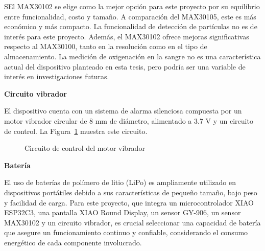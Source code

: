 \documentclass[
  letterpaper,
  DIV=11,
  numbers=noendperiod]{scrreport}
\begin{document}
SEl MAX30102 se elige como la mejor opción para este proyecto por su
equilibrio entre funcionalidad, costo y tamaño. A comparación del
MAX30105, este es más económico y más compacto. La funcionalidad de
detección de partículas no es de interés para este proyecto. Además, el
MAX30102 ofrece mejoras significativas respecto al MAX30100, tanto en la
resolución como en el tipo de almacenamiento. La medición de oxigenación
en la sangre no es una característica actual del dispositivo planteado
en esta tesis, pero podría ser una variable de interés en
investigaciones futuras.

\textbf{Circuito vibrador}

El dispositivo cuenta con un sistema de alarma silenciosa compuesta por
un motor vibrador circular de 8 mm de diámetro, alimentado a 3.7 V y un
circuito de control. La Figura~\ref{fig-circuito_motor} muestra este
circuito.

\begin{figure}


\caption{\label{fig-circuito_motor}Circuito de control del motor
vibrador}

\end{figure}%

\textbf{Batería}

El uso de baterías de polímero de litio (LiPo) es ampliamente utilizado
en dispositivos portátiles debido a sus características de pequeño
tamaño, bajo peso y facilidad de carga. Para este proyecto, que integra
un microcontrolador XIAO ESP32C3, una pantalla XIAO Round Display, un
sensor GY-906, un sensor MAX30102 y un circuito vibrador, es crucial
seleccionar una capacidad de batería que asegure un funcionamiento
continuo y confiable, considerando el consumo energético de cada
componente involucrado.
\end{document}
